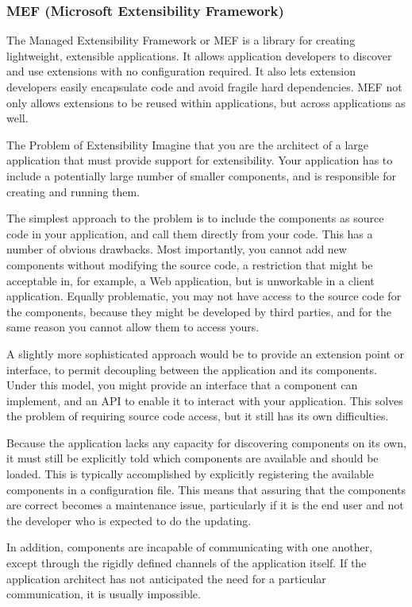 \subsubsection{MEF (Microsoft Extensibility Framework)}

The Managed Extensibility Framework or MEF is a library for creating lightweight, extensible applications. It allows application developers to discover and use extensions with no configuration required. It also lets extension developers easily encapsulate code and avoid fragile hard dependencies. MEF not only allows extensions to be reused within applications, but across applications as well.

The Problem of Extensibility
Imagine that you are the architect of a large application that must provide support for extensibility. Your application has to include a potentially large number of smaller components, and is responsible for creating and running them.

The simplest approach to the problem is to include the components as source code in your application, and call them directly from your code. This has a number of obvious drawbacks. Most importantly, you cannot add new components without modifying the source code, a restriction that might be acceptable in, for example, a Web application, but is unworkable in a client application. Equally problematic, you may not have access to the source code for the components, because they might be developed by third parties, and for the same reason you cannot allow them to access yours.

A slightly more sophisticated approach would be to provide an extension point or interface, to permit decoupling between the application and its components. Under this model, you might provide an interface that a component can implement, and an API to enable it to interact with your application. This solves the problem of requiring source code access, but it still has its own difficulties.

Because the application lacks any capacity for discovering components on its own, it must still be explicitly told which components are available and should be loaded. This is typically accomplished by explicitly registering the available components in a configuration file. This means that assuring that the components are correct becomes a maintenance issue, particularly if it is the end user and not the developer who is expected to do the updating.

In addition, components are incapable of communicating with one another, except through the rigidly defined channels of the application itself. If the application architect has not anticipated the need for a particular communication, it is usually impossible.


